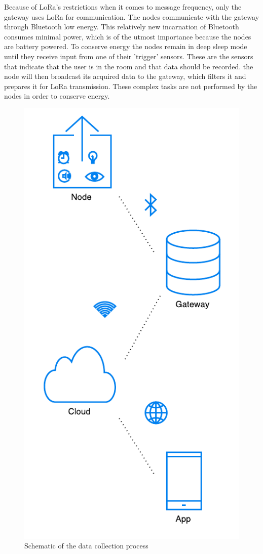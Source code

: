 \documentclass{below-ext}
\begin{document}
Because of LoRa's restrictions when it comes to message frequency, only the gateway uses LoRa for communication. The nodes communicate with the gateway through Bluetooth low energy. This relatively new incarnation of Bluetooth consumes minimal power, which is of the utmost importance because the nodes are battery powered. To conserve energy the nodes remain in deep sleep mode until they receive input from one of their  'trigger' sensors. These are the sensors that indicate that the user is in the room and that data should be recorded. the node will then broadcast its acquired data to the gateway, which filters it and prepares it for LoRa transmission. These complex tasks are not performed by the nodes in order to conserve energy.  

\begin{figure}
\label{fig:process}
\centering
\includegraphics[scale=0.6]{dataproces.pdf}
\caption{Schematic of the data collection process}
\end{figure}
\end{document}
